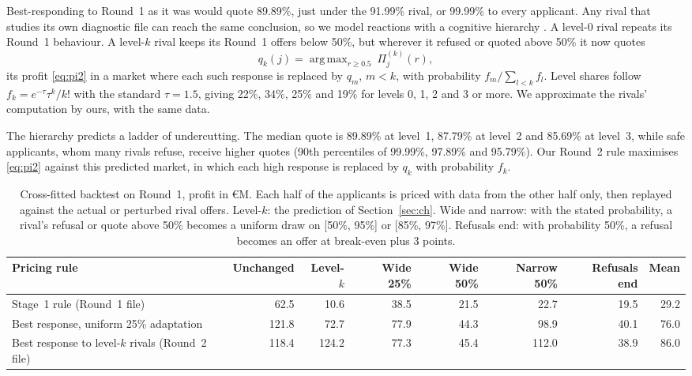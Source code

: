 \documentclass[10pt,twocolumn,a4paper]{article}
\makeatletter
\renewcommand\subsection{\@startsection{subsection}{2}{\z@}{-1.5ex \@plus -.4ex \@minus -.2ex}{0.5ex \@plus .2ex}{\normalfont\normalsize\bfseries}}
\DeclareMathOperator*{\argmax}{arg\,max}
\makeatother
\begin{document}
\subsection{Predicting the rivals' reaction}\label{sec:ch}
Best-responding to Round~1 as it was would quote 89.89\%, just under the 91.99\% rival, or 99.99\% to every applicant. Any rival that studies its own diagnostic file can reach the same conclusion, so we model reactions with a cognitive hierarchy \cite{chc2004}. A level-0 rival repeats its Round~1 behaviour. A level-$k$ rival keeps its Round~1 offers below 50\%, but wherever it refused or quoted above 50\% it now quotes
\begin{equation}\label{eq:qk}
q_k(j)=\argmax_{r\ge 0.5}\ \Pi^{(k)}_j(r),
\end{equation}
its profit \eqref{eq:pi2} in a market where each such response is replaced by $q_m$, $m<k$, with probability $f_m/\sum_{l<k}f_l$. Level shares follow $f_k=e^{-\tau}\tau^k/k!$ with the standard $\tau=1.5$, giving 22\%, 34\%, 25\% and 19\% for levels 0, 1, 2 and 3 or more. We approximate the rivals' computation by ours, with the same data.

The hierarchy predicts a ladder of undercutting. The median quote is 89.89\% at level~1, 87.79\% at level~2 and 85.69\% at level~3, while safe applicants, whom many rivals refuse, receive higher quotes (90th percentiles of 99.99\%, 97.89\% and 95.79\%). Our Round~2 rule maximises \eqref{eq:pi2} against this predicted market, in which each high response is replaced by $q_k$ with probability $f_k$.

\begin{table}[t]
\centering\small
\caption{Cross-fitted backtest on Round~1, profit in \euro M. Each half of the applicants is priced with data from the other half only, then replayed against the actual or perturbed rival offers. Level-$k$: the prediction of Section~\ref{sec:ch}. Wide and narrow: with the stated probability, a rival's refusal or quote above 50\% becomes a uniform draw on [50\%, 95\%] or [85\%, 97\%]. Refusals end: with probability 50\%, a refusal becomes an offer at break-even plus 3 points.}
\label{tab:bt}
\setlength{\tabcolsep}{5pt}
\begin{tabular}{lrrrrrrr}
\toprule
Pricing rule & Unchanged & Level-$k$ & Wide 25\% & Wide 50\% & Narrow 50\% & Refusals end & Mean\\
\midrule
Stage~1 rule (Round~1 file) & 62.5 & 10.6 & 38.5 & 21.5 & 22.7 & 19.5 & 29.2\\
Best response, uniform 25\% adaptation & 121.8 & 72.7 & 77.9 & 44.3 & 98.9 & 40.1 & 76.0\\
Best response to level-$k$ rivals (Round~2 file) & 118.4 & 124.2 & 77.3 & 45.4 & 112.0 & 38.9 & 86.0\\
\bottomrule
\end{tabular}
\end{table}
\end{document}
